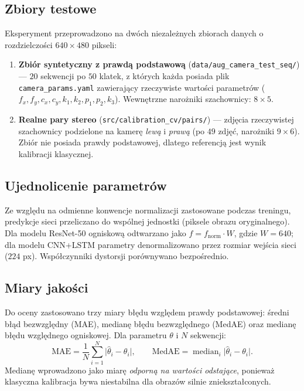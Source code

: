 \documentclass[12pt,a4paper]{report}
\begin{document}
\subsection{Zbiory testowe}
Eksperyment przeprowadzono na dwóch niezależnych zbiorach danych o rozdzielczości
$640 \times 480$ pikseli:
\begin{enumerate}[leftmargin=*]
  \item \textbf{Zbiór syntetyczny z prawdą podstawową} (\texttt{data/aug\_camera\_test\_seq/}) ---
        $20$ sekwencji po $50$ klatek, z których każda posiada plik \texttt{camera\_params.yaml}
        zawierający rzeczywiste wartości parametrów ($f_x, f_y, c_x, c_y, k_1, k_2, p_1, p_2, k_3$).
        Wewnętrzne narożniki szachownicy: $8 \times 5$.
  \item \textbf{Realne pary stereo} (\texttt{src/calibration\_cv/pairs/}) --- zdjęcia
        rzeczywistej szachownicy podzielone na kamerę \emph{lewą} i \emph{prawą} (po $49$ zdjęć,
        narożniki $9 \times 6$). Zbiór nie posiada prawdy podstawowej, dlatego referencją jest
        wynik kalibracji klasycznej.
\end{enumerate}

\subsection{Ujednolicenie parametrów}
Ze względu na odmienne konwencje normalizacji zastosowane podczas treningu, predykcje sieci
przeliczano do wspólnej jednostki (piksele obrazu oryginalnego). Dla modelu ResNet-50
ogniskową odtwarzano jako $f = f_{\text{norm}} \cdot W$, gdzie $W = 640$; dla modelu CNN+LSTM
parametry denormalizowano przez rozmiar wejścia sieci ($224$ px). Współczynniki dystorsji
porównywano bezpośrednio.

\subsection{Miary jakości}
Do oceny zastosowano trzy miary błędu względem prawdy podstawowej: średni błąd bezwzględny
(MAE), medianę błędu bezwzględnego (MedAE) oraz medianę błędu względnego ogniskowej.
Dla parametru $\theta$ i $N$ sekwencji:
\begin{equation}
  \text{MAE} = \frac{1}{N}\sum_{i=1}^{N} \big|\hat{\theta}_i - \theta_i\big|,
  \qquad
  \text{MedAE} = \operatorname{median}_i \big|\hat{\theta}_i - \theta_i\big|.
\end{equation}
Medianę wprowadzono jako miarę \emph{odporną na wartości odstające}, ponieważ klasyczna
kalibracja bywa niestabilna dla obrazów silnie zniekształconych.
\end{document}
